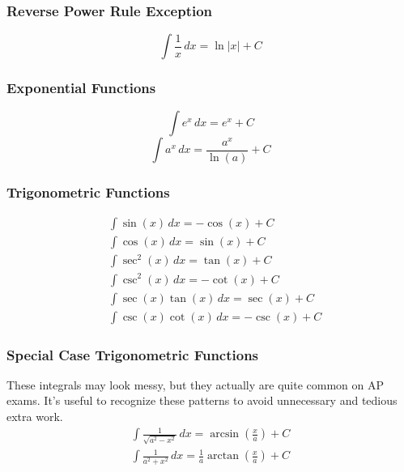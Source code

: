 \documentclass[12pt]{article}
\begin{document}
            \subsubsection{Reverse Power Rule Exception}
                \[ \int \frac{1}{x} \, dx = \ln |x| + C\]

            \subsubsection{Exponential Functions}
                \[ \int e^x \, dx = e^x + C \]
                \[ \int a^x \, dx = \frac{a^x}{\ln(a)} + C \]

            \subsubsection{Trigonometric Functions}
                \begin{align*}
                    &\int \sin(x) \, dx = -\cos(x) + C \\[6pt]
                    &\int \cos(x) \, dx = \sin(x) + C \\[6pt]
                    &\int \sec^2(x) \, dx = \tan(x) + C \\[6pt]
                    &\int \csc^2(x) \, dx = -\cot(x) + C \\[6pt]
                    &\int \sec(x)\tan(x) \, dx = \sec(x) + C \\[6pt]
                    &\int \csc(x)\cot(x) \, dx = -\csc(x) + C
                \end{align*}

            \subsubsection{Special Case Trigonometric Functions}
            \label{sec:arctanintegral}
                These integrals may look messy, but they actually are quite common on AP exams. It's useful to recognize these patterns to avoid unnecessary and tedious extra work.
                \begin{gather*}
                    \int \frac{1}{\sqrt{a^2 - x^2}} \, dx = \arcsin \left( \frac{x}{a} \right) + C \\[6pt]
                    \int \frac{1}{a^2 + x^2} \, dx = \frac{1}{a} \arctan \left( \frac{x}{a} \right) + C
                \end{gather*}
\end{document}
